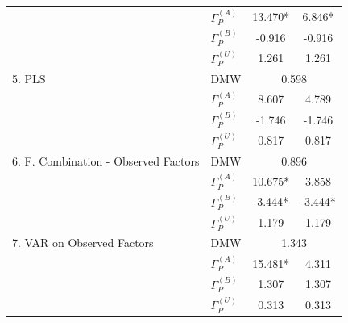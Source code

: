 \documentclass[11pt]{article}
\begin{document}
\begin{table}
\begin{tabular}{|l|l|c|c|}
\hline                                                                 
& $\Gamma_P^{(A)}$&13.470*&6.846*\\                                    
& $\Gamma_P^{(B)}$&-0.916&-0.916\\                                     
& $\Gamma_P^{(U)}$&1.261&1.261\\                                       
\hline                                                                 
5. PLS                              & DMW&\multicolumn{2}{|c|}{0.598}\\
\hline                                                                 
& $\Gamma_P^{(A)}$&8.607&4.789\\                                       
& $\Gamma_P^{(B)}$&-1.746&-1.746\\                                     
& $\Gamma_P^{(U)}$&0.817&0.817\\                                       
\hline                                                                 
6. F. Combination - Observed Factors& DMW&\multicolumn{2}{|c|}{0.896}\\
\hline                                                                 
& $\Gamma_P^{(A)}$&10.675*&3.858\\                                     
& $\Gamma_P^{(B)}$&-3.444*&-3.444*\\                                   
& $\Gamma_P^{(U)}$&1.179&1.179\\                                       
\hline                                                                 
7. VAR on Observed Factors          & DMW&\multicolumn{2}{|c|}{1.343}\\
\hline                                                                 
& $\Gamma_P^{(A)}$&15.481*&4.311\\                                     
& $\Gamma_P^{(B)}$&1.307&1.307\\                                       
& $\Gamma_P^{(U)}$&0.313&0.313\\                                       
\hline                                                                 
\end{tabular}                                                          
\end{table}  
\end{document}
